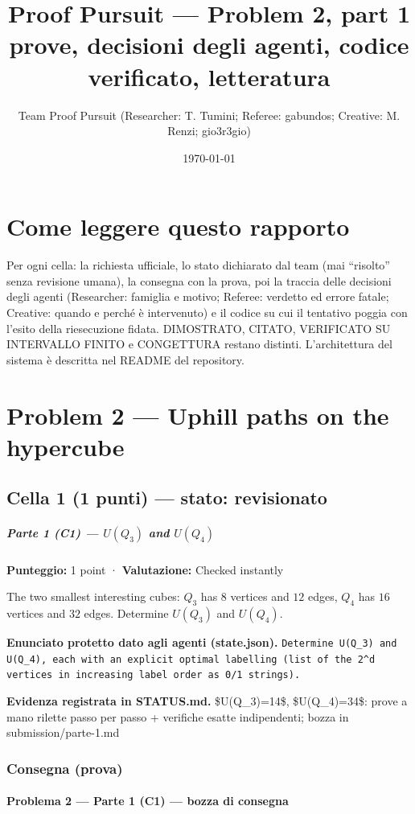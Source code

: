 \documentclass[11pt,a4paper]{article}
\title{Proof Pursuit --- Problem 2, part 1\\ \large prove, decisioni degli agenti, codice verificato, letteratura}
\author{Team Proof Pursuit (Researcher: T. Tumini; Referee: gabundos; Creative: M. Renzi; gio3r3gio)}
\date{\today}
\begin{document}
\maketitle\tableofcontents
\section*{Come leggere questo rapporto}
Per ogni cella: la richiesta ufficiale, lo stato dichiarato dal team (mai ``risolto'' senza revisione umana), la consegna
con la prova, poi la traccia delle decisioni degli agenti (Researcher: famiglia e motivo; Referee: verdetto ed errore
fatale; Creative: quando e perché è intervenuto) e il codice su cui il tentativo poggia con l'esito della riesecuzione
fidata. DIMOSTRATO, CITATO, VERIFICATO SU INTERVALLO FINITO e CONGETTURA restano distinti. L'architettura del sistema
è descritta nel README del repository.
\section{Problem 2 — Uphill paths on the hypercube}
\subsection{Cella 1 (1 punti) — stato: revisionato}
\subparagraph{\texorpdfstring{Parte 1 (C1) --- \(U(Q_3)\) and
\(U(Q_4)\)}{Parte 1 (C1) --- U(Q\_3) and U(Q\_4)}}\label{parte-1-c1-uq_3-and-uq_4}

\textbf{Punteggio:} 1 point · \textbf{Valutazione:} Checked instantly

The two smallest interesting cubes: \(Q_3\) has \(8\) vertices and
\(12\) edges, \(Q_4\) has \(16\) vertices and \(32\) edges. Determine
\(U(Q_3)\) and \(U(Q_4)\).

\textbf{Enunciato protetto dato agli agenti (state.json).} \texttt{Determine U(Q\_3) and U(Q\_4), each with an explicit optimal labelling (list of the 2\textasciicircum{}d vertices in increasing label order as 0/1 strings).}

\textbf{Evidenza registrata in STATUS.md.} \$U(Q\_3)=14\$, \$U(Q\_4)=34\$: prove a mano rilette passo per passo + verifiche esatte indipendenti; bozza in submission/parte-1.md

\subsubsection{Consegna (prova)}
\paragraph{Problema 2 --- Parte 1 (C1) --- bozza di
consegna}\label{problema-2-parte-1-c1-bozza-di-consegna}
\end{document}
